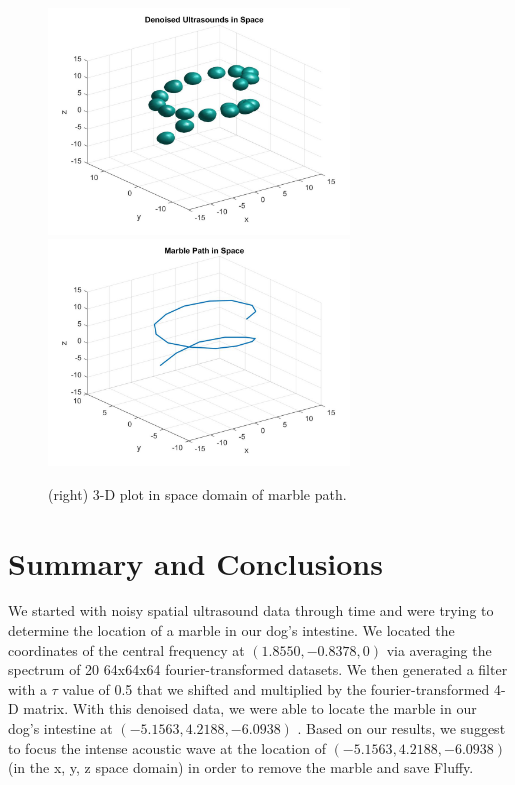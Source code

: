 \documentclass{article}
\begin{document}
\begin{figure}[H]
\begin{center}
\includegraphics[width = 8cm]{denoised3d}
\includegraphics[width = 8cm]{marblepath}
\caption{\label{fig:scaled_diss} (left) 3-D isosurface plot in space of the denoised marble. Isovalue of 0.6.}
\caption{\label{fig:scaled_diss} (right) 3-D plot in space domain of marble path.}
\end{center}
\end{figure}

\section*{\fontsize{19}{15}\selectfont Summary and Conclusions}
We started with noisy spatial ultrasound data through time and were trying to determine the location of a marble in our dog's intestine. We located the coordinates of the central frequency at $(1.8550, -0.8378, 0)$ via averaging the spectrum of 20 64x64x64 fourier-transformed datasets. We then generated a filter with a $\tau$ value of 0.5 that we shifted and multiplied by the fourier-transformed 4-D matrix. With this denoised data, we were able to locate the marble in our dog's intestine at $(-5.1563, 4.2188, -6.0938)$ . Based on our results, we suggest to focus the intense acoustic wave at the location of $(-5.1563, 4.2188, -6.0938)$ (in the x, y, z space domain) in order to remove the marble and save Fluffy. 
\pagebreak
\end{document}
